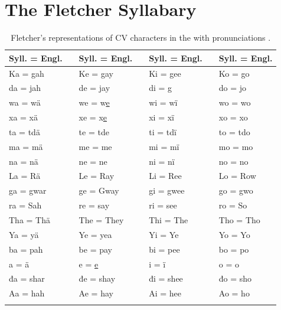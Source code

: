 \documentclass[output=paper]{LSP/langsci}
\begin{document}
\section{The Fletcher Syllabary}

\begin{table}
\begin{tabular}{lllllll}
\lsptoprule
Syll. = Engl. && Syll. = Engl. && Syll. = Engl. && Syll. = Engl.\\
\midrule
Ka = gah && Ke = gay && Ki = gee && Ko = go\\
da = jah && de = jay && di = g && do = jo\\
wa = wä && we = w\underline{e} && wi = wï && wo = wo\\
xa = xä && xe = x\underline{e} && xi = xï && xo = xo\\
ta = tdä && te = tde && ti = tdï && to = tdo\\
ma = mä && me = me && mi = mï && mo = mo\\
na = nä && ne = ne && ni = nï && no = no\\
La = Rä && Le = Ray && Li = Ree && Lo = Row\\
ga = gwar && ge = Gway && gi = gwee && go = gwo\\
ra = Sah && re = say && ri = see && ro = So\\
Tha = Thä && The = They && Thi = The && Tho = Tho\\
Ya = yä && Ye = yea && Yi = Ye && Yo = Yo\\
ba = pah && be = pay && bi = pee && bo = po\\
a = ä && e = \underline{e} && i = ï && o = o\\
đa = shar && đe = shay && đi = shee && đo = sho\\
Aa = hah && Ae = hay && Ai = hee && Ao = ho\\
\lspbottomrule
\end{tabular}
\caption{Fletcher's representations of CV characters in the   with  pronunciations \citep[adapted from][300]{Fletcher1890a}.}
\label{fletchercv}
\end{table}
\end{document}
